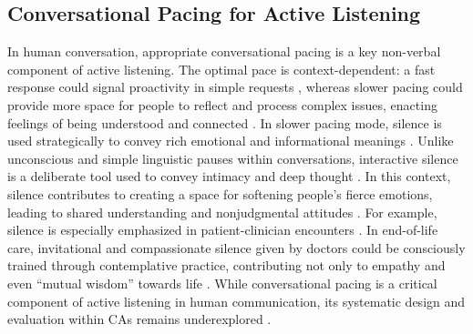 \subsection{Conversational Pacing for Active Listening}
\label{sec:related_work_pacing}
In human conversation, appropriate conversational pacing is a key non-verbal component of active listening. The optimal pace is context-dependent: a fast response could signal proactivity in simple requests \cite{templeton2023listening, templeton2022fast}, whereas slower pacing could provide more space for people to reflect and process complex issues, enacting feelings of being understood and connected \cite{bartels2016eloquent}. In slower pacing mode, silence is used strategically to convey rich emotional and informational meanings \cite{templeton2023listening}. Unlike unconscious and simple linguistic pauses within conversations, interactive silence is a deliberate tool used to convey intimacy and deep thought \cite{bruneau1973communicative}. In this context, silence contributes to creating a space for softening people's fierce emotions, leading to shared understanding and nonjudgmental attitudes \cite{hill2003therapist}. For example, silence is especially emphasized in patient-clinician encounters \cite{levitt2001sounds, knutson2015varieties}. In end-of-life care, invitational and compassionate silence given by doctors could be consciously trained through contemplative practice, contributing not only to empathy and even ``mutual wisdom'' towards life \cite{back2009compassionate}. While conversational pacing is a critical component of active listening in human communication, its systematic design and evaluation within CAs remains underexplored \cite{kafaee2024silence}.

